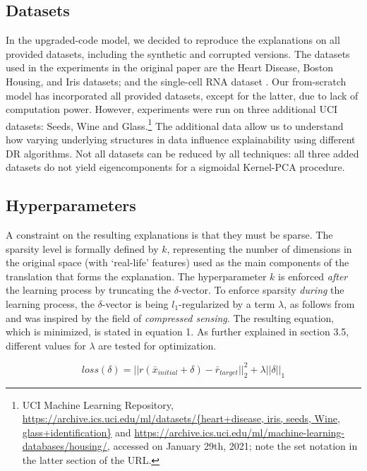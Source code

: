 \subsection{Datasets}
In the upgraded-code model, we decided to reproduce the explanations on all provided datasets, including the synthetic and corrupted versions. The datasets used in the experiments in the original paper are the Heart Disease, Boston Housing, and Iris datasets; and the single-cell RNA dataset \cite{shekhar2016comprehensive}. Our from-scratch model has incorporated all provided datasets, except for the latter, due to lack of computation power. However, experiments were run on three additional UCI datasets: Seeds, Wine and Glass.\footnote{UCI Machine Learning Repository, \url{https://archive.ics.uci.edu/ml/datasets/{heart+disease, iris, seeds, Wine, glass+identification}} and \url{https://archive.ics.uci.edu/ml/machine-learning-databases/housing/}, accessed on January 29th, 2021; note the set notation in the latter section of the URL.} The additional data allow us to understand how varying underlying structures in data influence explainability using different DR algorithms. Not all datasets can be reduced by all techniques: all three added datasets do not yield eigencomponents for a sigmoidal Kernel-PCA procedure.

\subsection{Hyperparameters}
A constraint on the resulting explanations is that they must be sparse. The sparsity level is formally defined by $k$, representing the number of dimensions in the original space (with `real-life' features) used as the main components of the translation that forms the explanation. The hyperparameter $k$ is enforced \textit{after} the learning process by truncating the $\delta$-vector. To enforce sparsity \textit{during} the learning process, the $\delta$-vector is being $l_1$-regularized by a term $\lambda$, as follows from \cite[p.~5]{plumb2020explaining} and was inspired by the field of \textit{compressed sensing}. The resulting equation, which is minimized, is stated in equation 1. As further explained in section 3.5, different values for $\lambda$ are tested for optimization.

\begin{equation}
loss(\delta) = ||r(\bar{x}_{initial} + \delta) - \bar{r}_{target}||^2_2 + \lambda||\delta||_1
\end{equation}

